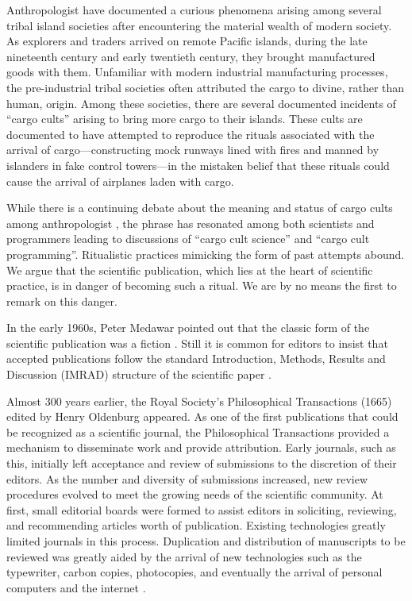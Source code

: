 \documentclass[ChapterTOCs,krantz2]{krantz} %
\begin{document}

Anthropologist have documented a curious phenomena arising among several tribal
island societies after encountering the material wealth of modern society. As
explorers and traders arrived on remote Pacific islands, during the late
nineteenth century and early twentieth century, they brought manufactured goods
with them.  Unfamiliar with modern industrial manufacturing processes, the
pre-industrial tribal societies often attributed the cargo to divine, rather
than human, origin. Among these societies, there are several documented
incidents of ``cargo cults'' arising to bring more cargo to their islands.
These cults are documented to have attempted to reproduce the rituals associated
with the arrival of cargo---constructing mock runways lined with fires and manned
by islanders in fake control towers---in the mistaken
belief that these rituals could cause the arrival of airplanes laden with
cargo.

While there is a continuing debate about the meaning and status of cargo cults
among anthropologist \cite{jebens2004cargo}, the phrase has resonated among both
scientists and programmers leading to discussions of ``cargo cult science'' and
``cargo cult programming''. Ritualistic practices mimicking the form of past
attempts abound. We argue that the scientific publication, which lies at the
heart of scientific practice, is in danger of becoming such a ritual. We are
by no means the first to remark on this danger.

In the early 1960s, Peter Medawar pointed out that the classic form of the
scientific publication was a fiction \cite{medawar1963scientific}. Still
it is common for editors to insist that accepted publications follow the
standard Introduction, Methods, Results and Discussion (IMRAD) structure of the
scientific paper \cite{sollaci2004introduction}.

Almost 300 years earlier, the Royal Society's Philosophical Transactions (1665)
edited by Henry Oldenburg appeared. As one of the first publications that could be
recognized as a scientific journal, the Philosophical Transactions provided a
mechanism to disseminate work and provide attribution. Early journals, such as this,
initially left acceptance and review of submissions to the discretion of their
editors. As the number and diversity of submissions increased, new review procedures
evolved to meet the growing needs of the scientific community. At first, small
editorial boards were formed to assist editors in soliciting, reviewing,
and recommending articles worth of publication. Existing technologies greatly
limited journals in this process. Duplication and distribution of manuscripts
to be reviewed was greatly aided by the arrival of new technologies such as
the typewriter, carbon copies, photocopies, and eventually the arrival of
personal computers and the internet \cite{spier2002history}.
\end{document}
